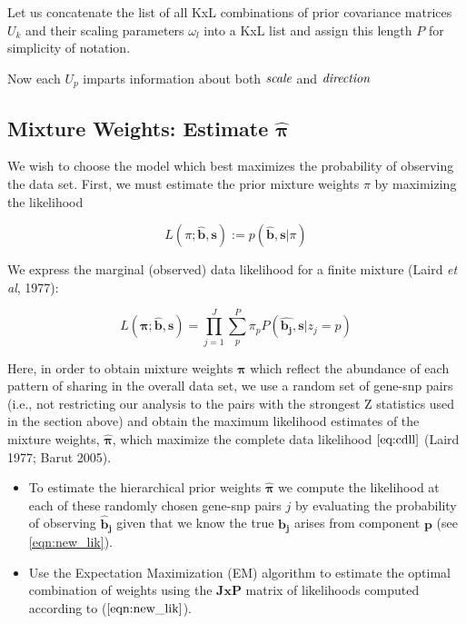\begin{enumerate}
Let us concatenate the list of all KxL combinations of prior covariance matrices $U_{k}$ and their scaling parameters $\omega_{l}$ into a KxL list and assign this length $P$ for simplicity of notation.

Now each $U_{p}$ imparts information about both $\emph{scale}$ and $\emph{direction}$

\subsection{Mixture Weights: Estimate $\hat{\bm{\pi}}$}
We wish to choose the model which best maximizes the probability of observing the data set. First, we must estimate the prior mixture weights $\pi$ by maximizing the likelihood 

\begin{equation}
L(\pi;\hat{\bm{b}}, \bm{s}) := p(\hat{\bm{b}}, \bm{s} | \pi) 
\label{eq:cdll}
\end{equation}

We express the marginal (observed) data likelihood for a finite mixture (Laird \emph{et al}, 1977):

\begin{equation}
L(\bm\pi;{\hat{\bm{b}}},\bm{s}) = \prod_{j=1}^J \sum_{p}^{P} \pi_{p} P(\hat{\bm{b_{j}}}, \bm{s} | z_{j}=p)
\label{eq:pihat}
\end{equation}

Here, in order to obtain mixture weights $\bm{\pi}$ which reflect the abundance of each pattern of sharing in the overall data set, we use a random set of gene-snp pairs (i.e., not restricting our analysis to the pairs with the strongest Z statistics used in the section above) and obtain the maximum likelihood estimates of the mixture weights, $\hat{\bm{\pi}}$, which maximize the complete data likelihood $\ref{eq:cdll}$ (Laird 1977; Barut 2005).

\begin{itemize}
\item  To estimate the hierarchical prior weights $\hat{\bm{\pi}}$ we compute the likelihood at each of these randomly chosen gene-snp pairs $j$ by evaluating the probability of observing $\bm{\hat{b}_{j}}$ given that we know the true $\bm{b_{j}}$ arises from component $\bm{p}$ (see \ref{eqn:new_lik}).
\item  Use the Expectation Maximization (EM) algorithm to estimate the optimal combination of weights using the  $\textbf{JxP}$ matrix of likelihoods computed according to ($\ref{eqn:new_lik}$).
\end{itemize}


\end{enumerate}
